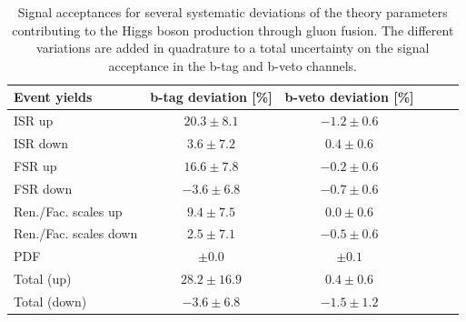\begin{table}[tdp]
  \begin{center}
   \label{table:sys_gga}
    \begin{tabular}{lccccc}
    \hline \hline
 Event yields      &   b-tag deviation [\%] &   b-veto deviation [\%] \\
\hline
ISR up & $ 20.3 \pm 8.1 $ 		& $ -1.2 \pm 0.6 $ \\
ISR down & $ 3.6 \pm 7.2 $ 		& $ 0.4 \pm 0.6 $ \\
FSR up & $ 16.6 \pm 7.8 $ 		& $ -0.2 \pm 0.6 $ \\
FSR down & $ -3.6 \pm 6.8 $	 	& $ -0.7 \pm 0.6 $ \\
Ren./Fac. scales up & $ 9.4 \pm 7.5 $ 	& $ 0.0 \pm 0.6 $ \\
Ren./Fac. scales down & $ 2.5 \pm 7.1 $ & $ -0.5 \pm 0.6$ \\
PDF &     $\pm 0.0 $ &$\pm  0.1 $ \\
\hline
Total (up) &    $ 28.2 \pm 16.9 $ &     $ 0.4 \pm 0.6$ \\
Total (down) &    $ -3.6 \pm 6.8 $ &     $ -1.5 \pm 1.2$ \\ 
\hline \hline
	\end{tabular}
   \caption{Signal acceptances for several systematic deviations of the theory parameters contributing to the Higgs boson production through gluon fusion. The different variations are added in quadrature to a total uncertainty on the signal acceptance in the b-tag and b-veto channels.}
  \end{center}
\end{table}




